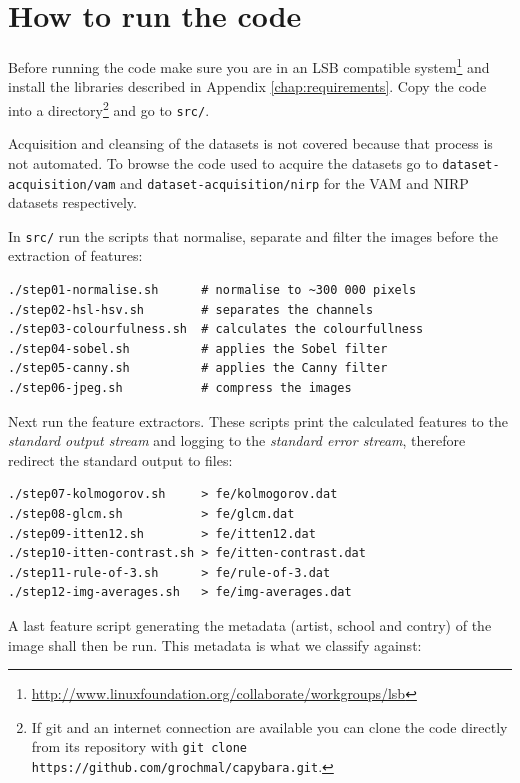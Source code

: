 \documentclass[11pt,a4paper,draft]{report}
\begin{document}
\chapter{How to run the code}

Before running the code make sure you are in an LSB compatible system\footnote{
\href{http://www.linuxfoundation.org/collaborate/workgroups/lsb}
{http://www.linuxfoundation.org/collaborate/workgroups/lsb}} and install the
libraries described in Appendix \ref{chap:requirements}.  Copy the code into a
directory\footnote{If git and an internet connection are available you can
clone the code directly from its repository with
\verb|git clone https://github.com/grochmal/capybara.git|.}
and go to \texttt{src/}.

Acquisition and cleansing of the datasets is not covered because that process
is not automated.  To browse the code used to acquire the datasets go to
\texttt{dataset-acquisition/vam} and \texttt{dataset-acquisition/nirp} for the
VAM and NIRP datasets respectively.

In \texttt{src/} run the scripts that normalise, separate and filter the images
before the extraction of features:

\begin{Verbatim}[frame=leftline]
./step01-normalise.sh      # normalise to ~300 000 pixels
./step02-hsl-hsv.sh        # separates the channels
./step03-colourfulness.sh  # calculates the colourfullness
./step04-sobel.sh          # applies the Sobel filter
./step05-canny.sh          # applies the Canny filter
./step06-jpeg.sh           # compress the images
\end{Verbatim}

Next run the feature extractors.  These scripts print the calculated features
to the \emph{standard output stream} and logging to the \emph{standard error
stream}, therefore redirect the standard output to files:

\begin{Verbatim}[frame=leftline]
./step07-kolmogorov.sh     > fe/kolmogorov.dat
./step08-glcm.sh           > fe/glcm.dat
./step09-itten12.sh        > fe/itten12.dat
./step10-itten-contrast.sh > fe/itten-contrast.dat
./step11-rule-of-3.sh      > fe/rule-of-3.dat
./step12-img-averages.sh   > fe/img-averages.dat
\end{Verbatim}

A last feature script generating the metadata (artist, school and contry) of
the image shall then be run.  This metadata is what we classify against:
\end{document}
